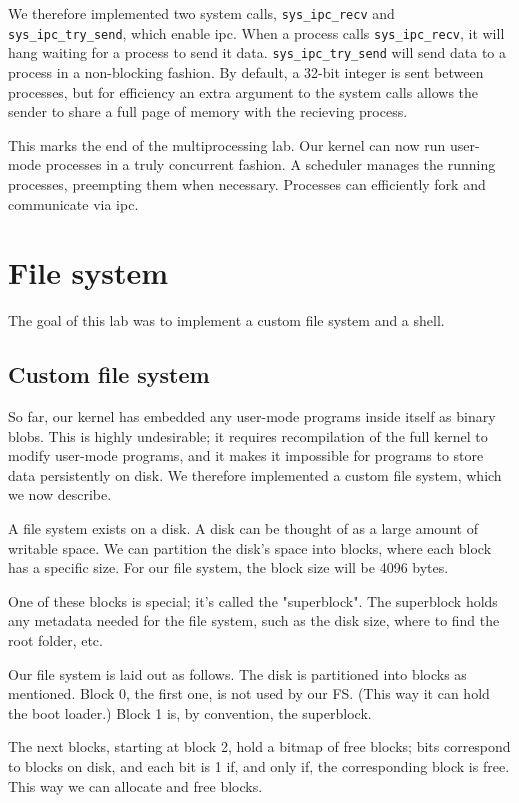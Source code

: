 \documentclass{article}
\begin{document}
We therefore implemented two system calls, \texttt{sys\_ipc\_recv} and
\texttt{sys\_ipc\_try\_send}, which enable \gls{ipc}. When a process calls 
\texttt{sys\_ipc\_recv}, it will hang waiting for a process to send it data.
\texttt{sys\_ipc\_try\_send} will send data to a process in a non-blocking
fashion. By default, a 32-bit integer is sent between processes, but for
efficiency an extra argument to the system calls allows the sender to share a
full page of memory with the recieving process.


This marks the end of the multiprocessing lab. Our kernel can now run
user-mode processes in a truly concurrent fashion. A scheduler manages the
running processes, preempting them when necessary. Processes can efficiently
fork and communicate via \gls{ipc}.


\section{File system}
The goal of this lab was to implement a custom file system and a shell.

\subsection{Custom file system}
So far, our kernel has embedded any user-mode programs inside itself as binary
blobs. This is highly undesirable; it requires recompilation of the full
kernel to modify user-mode programs, and it makes it impossible for programs
to store data persistently on disk. We therefore implemented a custom file
system, which we now describe.

A file system exists on a disk. A disk can be thought of as a large amount of
writable space. We can partition the disk's space into blocks, where each
block has a specific size. For our file system, the block size will be 4096
bytes.

One of these blocks is special; it's called the "superblock". The superblock
holds any metadata needed for the file system, such as the disk size, where to
find the root folder, etc.

Our file system is laid out as follows. The disk is partitioned into blocks as
mentioned. Block 0, the first one, is not used by our FS. (This way it can
hold the boot loader.) Block 1 is, by convention, the superblock. 

The next blocks, starting at block 2, hold a bitmap of free blocks; bits
correspond to blocks on disk, and each bit is 1 if, and only if, the
corresponding block is free. This way we can allocate and free blocks.
\end{document}
